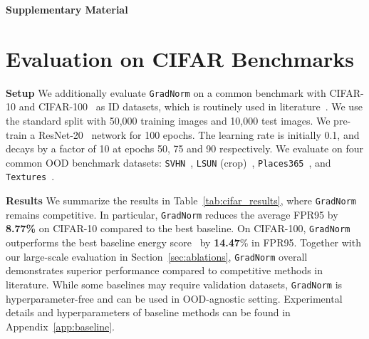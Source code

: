 \documentclass{article}
\begin{document}
\newpage


























\newpage
\appendix
\onecolumn
  
\begin{center}
    \Large{\textbf{Supplementary Material}}
\end{center}





















\section{Evaluation on CIFAR Benchmarks}
\label{app:cifar}
\textbf{Setup}
We additionally evaluate \texttt{GradNorm} on a common benchmark with CIFAR-10 and CIFAR-100~\cite{krizhevsky2009learning} as ID datasets, which is routinely used in literature~\cite{hendrycks2016baseline,liang2018enhancing,hsu2020generalized,liu2020energy,lee2018simple}. We use the standard split with 50,000 training images and 10,000 test images. We pre-train a ResNet-20~\cite{he2016deep} network for 100 epochs. The learning rate is initially 0.1, and decays by a factor of 10 at epochs 50, 75 and 90 respectively. We evaluate on four common OOD benchmark datasets: \texttt{SVHN}~\cite{netzer2011reading}, \texttt{LSUN} (crop)~\cite{yu2015lsun}, \texttt{Places365}~\cite{zhou2017places}, and \texttt{Textures}~\cite{cimpoi14describing}. 

\textbf{Results} We summarize the results in Table~\ref{tab:cifar_results}, where \texttt{GradNorm} remains competitive. In particular, \texttt{GradNorm} reduces the average FPR95 by \textbf{8.77\%} on CIFAR-10 compared to the best baseline. On CIFAR-100, \texttt{GradNorm} outperforms the best baseline energy score~\cite{liu2020energy} by \textbf{14.47}\% in FPR95. Together with our large-scale evaluation in Section~\ref{sec:ablations}, \texttt{GradNorm} overall demonstrates superior performance compared to competitive methods in literature. While some baselines may require validation datasets, \texttt{GradNorm} is hyperparameter-free and can be used in OOD-agnostic setting. {Experimental details and hyperparameters of baseline methods can be found in Appendix~\ref{app:baseline}}. 
\end{document}
